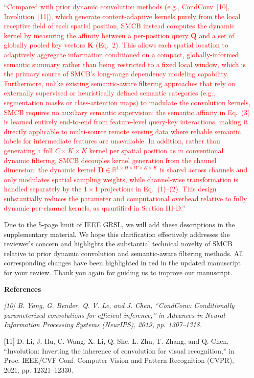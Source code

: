 ``\textcolor{red}{Compared with prior dynamic convolution methods (e.g., CondConv~[10], Involution~[11]), which generate content-adaptive kernels purely from the local receptive field of each spatial position, SMCB instead computes the dynamic kernel by measuring the affinity between a per-position query $\mathbf{Q}$ and a set of globally pooled key vectors $\mathbf{K}$ (Eq.~2). This allows each spatial location to adaptively aggregate information conditioned on a compact, globally-informed semantic summary rather than being restricted to a fixed local window, which is the primary source of SMCB's long-range dependency modeling capability. Furthermore, unlike existing semantic-aware filtering approaches that rely on externally supervised or heuristically defined semantic categories (e.g., segmentation masks or class-attention maps) to modulate the convolution kernels, SMCB requires no auxiliary semantic supervision: the semantic affinity in Eq.~(3) is learned entirely end-to-end from feature-level query-key interactions, making it directly applicable to multi-source remote sensing data where reliable semantic labels for intermediate features are unavailable. In addition, rather than generating a full $C \times K \times K$ kernel per spatial position as in conventional dynamic filtering, SMCB decouples kernel generation from the channel dimension: the dynamic kernel $\mathbf{D} \in \mathbb{R}^{1 \times H \times W \times K \times K}$ is shared across channels and only modulates spatial sampling weights, while channel-wise transformation is handled separately by the $1\times1$ projections in Eq.~(1)--(2). This design substantially reduces the parameter and computational overhead relative to fully dynamic per-channel kernels, as quantified in Section III-D.}''

Due to the 5-page limit of IEEE GRSL, we will add these descriptions in the supplementary material. We hope this clarification effectively addresses the reviewer's concern and highlights the substantial technical novelty of SMCB relative to prior dynamic convolution and semantic-aware filtering methods. All corresponding changes have been highlighted in red in the updated manuscript for your review. Thank you again for guiding us to improve our manuscript.

\textbf{References}

{\footnotesize\it
[10] B. Yang, G. Bender, Q. V. Le, and J. Chen, ``CondConv: Conditionally parameterized convolutions for efficient inference,'' in Advances in Neural Information Processing Systems (NeurIPS), 2019, pp. 1307--1318.

[11] D. Li, J. Hu, C. Wang, X. Li, Q. She, L. Zhu, T. Zhang, and Q. Chen, ``Involution: Inverting the inherence of convolution for visual recognition,'' in Proc. IEEE/CVF Conf. Computer Vision and Pattern Recognition (CVPR), 2021, pp. 12321--12330.
}

